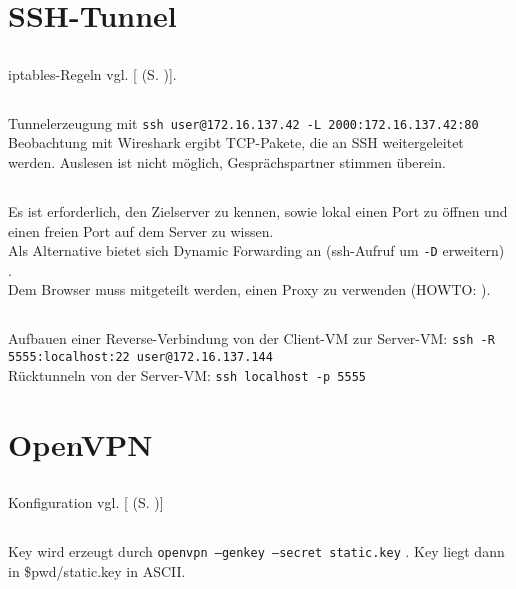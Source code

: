 \documentclass[twoside]{article}
\newcommand{\ttt}[1]{%
	\texttt{#1}%
}
\newcommand{\mref}[1]{[\nameref{#1} (S. \pageref{#1})]}
\begin{document}
\section{SSH-Tunnel}
\label{sec:ssh-tunnel}
	\subsection{}
	\label{ssec:4.1}
	iptables-Regeln vgl. \mref{a4-1}.
	\subsection{}
	\label{ssec:4.2}
	Tunnelerzeugung mit \ttt{ssh user@172.16.137.42 -L 2000:172.16.137.42:80}\\
	Beobachtung mit Wireshark ergibt TCP-Pakete, die an SSH weitergeleitet werden.
	Auslesen ist nicht möglich, Gesprächspartner stimmen überein.
	\subsection{}
	\label{ssec:4.3}
	Es ist erforderlich, den Zielserver zu kennen, sowie lokal einen Port zu öffnen und einen freien Port auf dem Server zu wissen.\\
	Als Alternative bietet sich Dynamic Forwarding an (ssh-Aufruf um \ttt{-D} erweitern) \cite{ubuntu:ssh}.\\
	Dem Browser muss mitgeteilt werden, einen Proxy zu verwenden (HOWTO: \cite{ubuntu:sshdyn}).
	\subsection{}
	\label{ssec:4.4}
	Aufbauen einer Reverse-Verbindung von der Client-VM zur Server-VM: \ttt{ssh -R 5555:localhost:22 user@172.16.137.144}\\
	Rücktunneln von der Server-VM: \ttt{ssh localhost -p 5555} \cite{reverse-ssh}
	
\section{OpenVPN}
\label{sec:openvpn}
	\subsection{}
	\label{ssec:5.1}
	Konfiguration vgl. \mref{a5-1}
	\subsection{}
	\label{ssec:5.2}
	Key wird erzeugt durch \ttt{openvpn --genkey --secret static.key}.
	Key liegt dann in \$pwd/static.key in ASCII.
\end{document}
